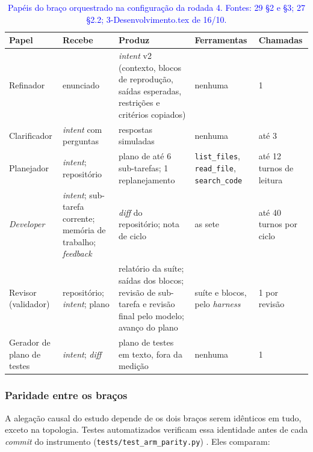 \begin{table}[t]
\centering
\color{blue}
\caption{\textcolor{blue}{Papéis do braço orquestrado na configuração da rodada 4. Fontes: 29 \S2 e \S3; 27 \S2.2; 3-Desenvolvimento.tex de 16/10.}}
\label{tab-papeis}
\footnotesize
\begin{tabular}{lp{3.0cm}p{3.8cm}p{2.3cm}p{2.1cm}}
\toprule
Papel & Recebe & Produz & Ferramentas & Chamadas \\
\midrule
Refinador & enunciado & \textit{intent} v2 (contexto, blocos de reprodução, saídas esperadas, restrições e critérios copiados) & nenhuma & 1 \\
Clarificador & \textit{intent} com perguntas & respostas simuladas & nenhuma & até 3 \\
Planejador & \textit{intent}; repositório & plano de até 6 sub-tarefas; 1 replanejamento & \texttt{list\_files}, \texttt{read\_file}, \texttt{search\_code} & até 12 turnos de leitura \\
\textit{Developer} & \textit{intent}; sub-tarefa corrente; memória de trabalho; \textit{feedback} & \textit{diff} do repositório; nota de ciclo & as sete & até 40 turnos por ciclo \\
Revisor (validador) & repositório; \textit{intent}; plano & relatório da suíte; saídas dos blocos; revisão de sub-tarefa e revisão final pelo modelo; avanço do plano & suíte e blocos, pelo \textit{harness} & 1 por revisão \\
Gerador de plano de testes & \textit{intent}; \textit{diff} & plano de testes em texto, fora da medição & nenhuma & 1 \\
\bottomrule
\end{tabular}
\end{table}

\subsubsection{Paridade entre os braços}

A alegação causal do estudo depende de os dois braços serem idênticos em tudo, exceto na topologia. Testes automatizados verificam essa identidade antes de cada \textit{commit} do instrumento (\texttt{tests/test\_arm\_parity.py}) . Eles comparam:

